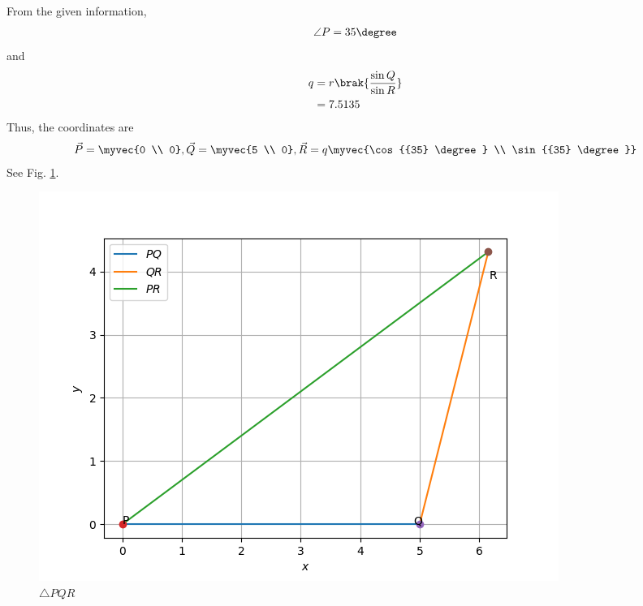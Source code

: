 From the given information, 
%
\begin{align}
\angle{P} = {35} \degree
\end{align}
and 
\begin{align}
  q&= r\brak{\frac{\sin{Q}}{\sin{R}}}  \\
  &= 7.5135
\end{align}
%  
Thus, the coordinates are 
\begin{align}
  \vec{P} =\myvec{0 \\ 0},
  \vec{Q} =\myvec{5 \\ 0},
  \vec{R} =q\myvec{\cos{{35} \degree} \\ \sin{{35}  \degree}}
\end{align}
See Fig. \ref{aug/2/5/eq}.
\begin{figure}[hbt!]
\centering
\includegraphics[width=\columnwidth]{solutions/aug/2/5/Figure_2.png}
\caption{$\triangle PQR $}
\label{aug/2/5/eq}	
\end{figure}





